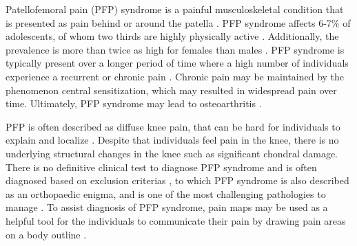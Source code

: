 Patellofemoral pain (PFP) syndrome is a painful musculoskeletal condition that is presented as pain behind or around the patella \citep{Maclachlan2017, Smith2015}. PFP syndrome affects 6-7\% of adolescents, of whom two thirds are highly physically active \citep{Rathleff2015}. Additionally, the prevalence is more than twice as high for females than males \citep{Rathleff2015, Petersen2013}.
PFP syndrome is typically present over a longer period of time where a high number of individuals experience a recurrent or chronic pain \citep{Witvrouw2014}. Chronic pain may be maintained by the phenomenon central sensitization, which may resulted in widespread pain over time. Ultimately, PFP syndrome may lead to osteoarthritis \citep{Petersen2013, Crossley2016}. 

\noindent
PFP is often described as diffuse knee pain, that can be hard for individuals to explain and localize \citep{Witvrouw2014}. Despite that individuals feel pain in the knee, there is no underlying structural changes in the knee such as significant chondral damage. There is no definitive clinical test to diagnose PFP syndrome and is often diagnosed based on exclusion criterias \citep{Petersen2013}, to which PFP syndrome is also described as an orthopaedic enigma, and is one of the most challenging pathologies to manage \citep{Dye2001}.
To assist diagnosis of PFP syndrome, pain maps may be used as a helpful tool for the individuals to communicate their pain by drawing pain areas on a body outline \citep{Boudreau2016}.

